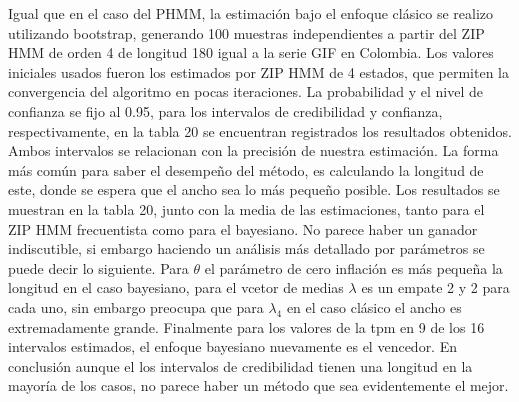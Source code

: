 \documentclass[a4paper]{article}\usepackage[]{graphicx}\usepackage[]{color}
\begin{document}
Igual que en el caso del PHMM, la estimación bajo el enfoque clásico se realizo utilizando bootstrap, generando 100 muestras independientes a partir del ZIP HMM de orden 4 de longitud 180 igual a la serie GIF en Colombia. Los valores iniciales usados fueron los estimados por ZIP HMM de 4 estados, que permiten la convergencia del algoritmo en pocas iteraciones. La probabilidad y el nivel de confianza se fijo al 0.95, para los intervalos de credibilidad y confianza, respectivamente, en la tabla 20 se encuentran registrados los resultados obtenidos.
\\
Ambos intervalos se relacionan con la precisión de nuestra estimación. La forma más común para saber el desempeño del método, es calculando la longitud de este, donde se espera que el ancho sea lo más pequeño posible. Los resultados se muestran en la tabla 20, junto con la media de las estimaciones, tanto para el ZIP HMM frecuentista como para el bayesiano. No parece haber un ganador indiscutible, si embargo haciendo un análisis más detallado por parámetros se puede decir lo siguiente. Para $\theta$ el parámetro de cero inflación es más pequeña la longitud en el caso bayesiano, para el vcetor de medias $\lambda$ es un empate 2 y 2 para cada uno, sin embargo preocupa que para $\lambda_4$ en el caso clásico el ancho es extremadamente grande. Finalmente para los valores de la tpm en 9 de los 16 intervalos estimados, el enfoque bayesiano nuevamente es el vencedor. En conclusión aunque el los intervalos de credibilidad tienen una longitud en la mayoría de los casos, no parece haber un método que sea evidentemente el mejor.
\end{document}
